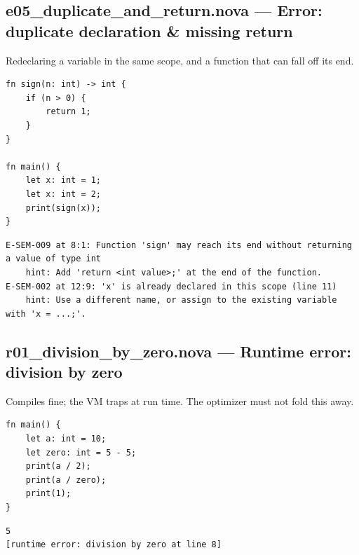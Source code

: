 \subsection*{e05\_duplicate\_and\_return.nova --- Error: duplicate declaration \& missing return}
\noindent Redeclaring a variable in the same scope, and a function that can fall off its end.
\begin{lstlisting}[language=nova,]
fn sign(n: int) -> int {
    if (n > 0) {
        return 1;
    }
}

fn main() {
    let x: int = 1;
    let x: int = 2;
    print(sign(x));
}
\end{lstlisting}
\begin{tcolorbox}[colback=red!4,colframe=red!60!black,title={Compiler output},fonttitle=\bfseries\small,boxsep=2pt,left=4pt,right=4pt,top=2pt,bottom=2pt]
\begin{lstlisting}[basicstyle=\ttfamily\scriptsize,frame=none,backgroundcolor=\color{white}]
E-SEM-009 at 8:1: Function 'sign' may reach its end without returning a value of type int
    hint: Add 'return <int value>;' at the end of the function.
E-SEM-002 at 12:9: 'x' is already declared in this scope (line 11)
    hint: Use a different name, or assign to the existing variable with 'x = ...;'.
\end{lstlisting}
\end{tcolorbox}
\subsection*{r01\_division\_by\_zero.nova --- Runtime error: division by zero}
\noindent Compiles fine; the VM traps at run time. The optimizer must not fold this away.
\begin{lstlisting}[language=nova,]
fn main() {
    let a: int = 10;
    let zero: int = 5 - 5;
    print(a / 2);
    print(a / zero);
    print(1);
}
\end{lstlisting}
\begin{tcolorbox}[colback=green!4,colframe=green!45!black,title={Program output (optimized VM)},fonttitle=\bfseries\small,boxsep=2pt,left=4pt,right=4pt,top=2pt,bottom=2pt]
\begin{lstlisting}[basicstyle=\ttfamily\scriptsize,frame=none,backgroundcolor=\color{white}]
5
[runtime error: division by zero at line 8]
\end{lstlisting}
\end{tcolorbox}
